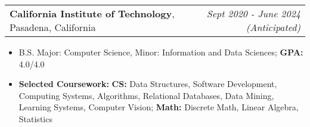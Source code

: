 \documentclass[letterpaper,11pt]{article}
\makeatletter
\newcommand{\resitem}[1]{\item[--] #1}
\newcommand{\edusubheading}[3]{
	\begin{tabular*}{7.5in}{l@{\extracolsep{\fill}}r}
		\textbf{#1}, #2 & \textit{#3} \\
	\end{tabular*}
	}
\makeatother
\begin{document}

\edusubheading{California Institute of Technology}{Pasadena, California}{Sept 2020 - June 2024 (Anticipated)}
\begin{itemize}[leftmargin=*]
	\resitem{B.S. Major: Computer Science, Minor: Information and Data Sciences; \textbf{GPA:} 4.0/4.0}
	\resitem{\textbf{Selected Coursework:} \textbf{CS:} Data Structures, Software Development, Computing Systems, Algorithms, Relational Databases, Data Mining, Learning Systems, Computer Vision; \textbf{Math:} Discrete Math, Linear Algebra, Statistics}
\end{itemize}

\end{document}
